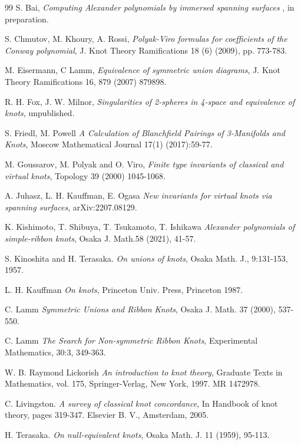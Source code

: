 \documentclass{amsart}
\theoremstyle{definition}
\theoremstyle{remark}
\numberwithin{equation}{subsection}
\begin{document}
\begin{thebibliography}{99}
 S. Bai, \textit{Computing Alexander polynomials by immersed spanning surfaces }, in preparation.

 S. Chmutov, M. Khoury, A. Rossi, \textit{Polyak-Viro formulas for coefficients of the Conway polynomial}, J. Knot Theory Ramifications 18 (6) (2009), pp. 773-783.

 M. Eisermann, C Lamm, \textit{Equivalence of symmetric union diagrams}, J. Knot Theory Ramifications 16, 879 (2007) 879898.

 R. H. Fox, J. W. Milnor, \textit{Singularities of 2-spheres in 4-space and equivalence of knots}, unpublished.

 S. Friedl, M. Powell \textit{A Calculation of Blanchfield Pairings of 3-Manifolds and Knots}, Moscow Mathematical Journal 17(1) (2017):59-77.

 M. Goussarov, M. Polyak and O. Viro, \textit{Finite type invariants of classical and virtual knots}, Topology 39 (2000) 1045-1068.

 A. Juhasz, L. H. Kauffman, E. Ogasa \textit{New invariants for virtual knots via spanning surfaces}, arXiv:2207.08129.

 K. Kishimoto, T. Shibuya, T. Tsukamoto, T. Ishikawa \textit{Alexander polynomials of simple-ribbon knots}, Osaka J. Math.58 (2021), 41-57.

 S. Kinoshita and H. Terasaka. \textit{On unions of knots}, Osaka Math. J., 9:131-153, 1957.

 L. H. Kauffman \textit{On knots}, Princeton Univ. Press, Princeton 1987.

 C. Lamm \textit{Symmetric Unions and Ribbon Knots}, Osaka J. Math. 37 (2000), 537-550.

 C. Lamm \textit{The Search for Non-symmetric Ribbon Knots}, Experimental Mathematics, 30:3, 349-363.

 W. B. Raymond Lickorish \textit{An introduction to knot theory}, Graduate Texts in Mathematics, vol. 175, Springer-Verlag, New York, 1997. MR 1472978.

 C. Livingston. \textit{A survey of classical knot concordance}, In Handbook of knot theory, pages 319-347. Elsevier B. V., Amsterdam, 2005.

 H. Terasaka. \textit{On null-equivalent knots}, Osaka Math. J. 11 (1959), 95-113.
\end{thebibliography}
\end{document}
